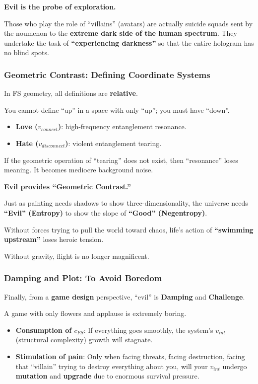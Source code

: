 \textbf{Evil is the probe of exploration.}

Those who play the role of ``villains'' (avatars) are actually suicide squads sent by the noumenon to the \textbf{extreme dark side of the human spectrum}. They undertake the task of \textbf{``experiencing darkness''} so that the entire hologram has no blind spots.

\subsubsection{Geometric Contrast: Defining Coordinate Systems}

In FS geometry, all definitions are \textbf{relative}.

You cannot define ``up'' in a space with only ``up''; you must have ``down''.

\begin{itemize}
\item \textbf{Love ($v_{connect}$)}: high-frequency entanglement resonance.

\item \textbf{Hate ($v_{disconnect}$)}: violent entanglement tearing.
\end{itemize}

If the geometric operation of ``tearing'' does not exist, then ``resonance'' loses meaning. It becomes mediocre background noise.

\textbf{Evil provides ``Geometric Contrast.''}

Just as painting needs shadows to show three-dimensionality, the universe needs \textbf{``Evil'' (Entropy)} to show the slope of \textbf{``Good'' (Negentropy)}.

Without forces trying to pull the world toward chaos, life's action of \textbf{``swimming upstream''} loses heroic tension.

Without gravity, flight is no longer magnificent.

\subsubsection{Damping and Plot: To Avoid Boredom}

Finally, from a \textbf{game design} perspective, ``evil'' is \textbf{Damping} and \textbf{Challenge}.

A game with only flowers and applause is extremely boring.

\begin{itemize}
\item \textbf{Consumption of $c_{FS}$}: If everything goes smoothly, the system's $v_{int}$ (structural complexity) growth will stagnate.

\item \textbf{Stimulation of pain}: Only when facing threats, facing destruction, facing that ``villain'' trying to destroy everything about you, will your $v_{int}$ undergo \textbf{mutation} and \textbf{upgrade} due to enormous survival pressure.
\end{itemize}

